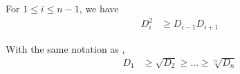 \documentclass{subfile}
\begin{document}
		\begin{theorem}\label{thm:newton}
			For $1\leq i\leq n-1$, we have
				\begin{align*}
					D_{i}^{2}
						& \geq D_{i-1}D_{i+1}
				\end{align*}
		\end{theorem}
	
		\begin{theorem}\label{thm:maclaurin}
			With the same notation as ,
				\begin{align*}
					D_{1}
						& \geq \sqrt{D_{2}}\geq\ldots\geq\sqrt[n]{D_{n}}
				\end{align*}
		\end{theorem}
\end{document}
